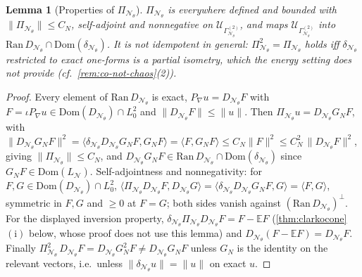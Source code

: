 \documentclass[reqno,final,11pt]{amsart}
\theoremstyle{plain}
\newtheorem{lemma}[theorem]{Lemma}
\theoremstyle{definition}
\theoremstyle{remark}
\newcommand{\E}{\mathbb E}
\newcommand{\Dom}{\mathrm{Dom}}
\newcommand{\cN}{\mathcal N}
\newcommand{\cU}{\mathcal U}
\newcommand{\GamN}{\Gamma^{(2)}_{\cN_\theta}}
\newcommand{\DN}{D_{\cN_\theta}}
\newcommand{\divN}{\delta_{\cN_\theta}}
\newcommand{\PiN}{\Pi_{\cN_\theta}}
\newcommand{\Ltwoz}{L^2_0}
\begin{document}
\begin{lemma}[Properties of $\PiN$]\label{lem:PiN-props}
$\PiN$ is everywhere defined and bounded with $\|\PiN\|\le C_N$, self-adjoint and
nonnegative on $\cU_{\GamN}$, and maps $\cU_{\GamN}$ into
$\mathrm{Ran}\,\DN\cap\Dom(\divN)$. It is not idempotent in general:
$\PiN^2=\PiN$ holds iff $\divN$ restricted to exact one-forms is a partial
isometry, which the energy setting does not provide (cf.\
\cref{rem:co-not-chaos}(2)).
\end{lemma}
\begin{proof}
Every element of $\mathrm{Ran}\,\DN$ is exact, $P_\nabla u=\DN F$ with
$F=\iota P_\nabla u\in\Dom(\DN)\cap\Ltwoz$ and $\|\DN F\|\le\|u\|$. Then
$\PiN u=\DN G_NF$, with
$\|\DN G_NF\|^2=\langle\divN\DN G_NF,G_NF\rangle=\langle F,G_NF\rangle
\le C_N\|F\|^2\le C_N^2\,\|\DN F\|^2$, giving $\|\PiN\|\le C_N$, and
$\DN G_NF\in\mathrm{Ran}\,\DN\cap\Dom(\divN)$ since
$G_NF\in\Dom(L_{\cN})$. Self-adjointness and nonnegativity: for $F,G\in
\Dom(\DN)\cap\Ltwoz$,
$\langle\PiN\DN F,\DN G\rangle=\langle\divN\DN G_NF,G\rangle=\langle F,G\rangle$,
symmetric in $F,G$ and $\ge0$ at $F=G$; both sides vanish against
$(\mathrm{Ran}\,\DN)^{\perp}$. For the displayed inversion property,
$\divN\PiN\DN F=F-\E F$ (\cref{thm:clarkocone}$(\mathrm i)$ below, whose proof
does not use this lemma) and $\DN(F-\E F)=\DN F$. Finally
$\PiN^2\,\DN F=\DN G_N^2F\neq\DN G_NF$ unless $G_N$ is the identity on the
relevant vectors, i.e.\ unless $\|\divN u\|=\|u\|$ on exact $u$.
\end{proof}
\end{document}
